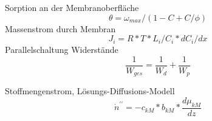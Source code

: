 \documentclass[ 11pt
				,ngerman
				,headsepline
				,headings=small
				,numbers=noenddot %
				,draft=false
				,BCOR=0mm %
				,DIV=12
				,captions=tableheading
				,paper=a4
				,abstracton
                ]{scrreprt}
\begin{document}
\pagestyle{empty}
Sorption an der Membranoberfläche
\begin{equation}
\theta = \omega_{max} / (1-C+C/\phi)
\end{equation}
Massenstrom durch Membran
\begin{equation}
J_{i} = R*T*L_{i}/C_{i}*dC_{i}/dx
\end{equation}
Parallelschaltung Widerstände
\begin{equation}
\frac{1}{W_{ges}} = \frac{1}{W_{d}} + \frac{1}{W_{p}}
\end{equation}

Stoffmengenstrom, Lösungs-Diffusions-Modell
\begin{equation}
\dot{n}^{\prime\prime} = - c_{kM} * b_{kM} * \frac{d\mu_{kM}}{dz} 
\end{equation}
\end{document}
